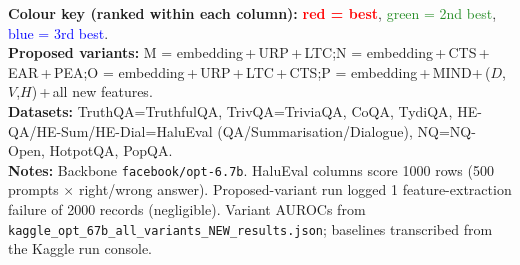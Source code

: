 \documentclass[10pt]{article}
\begin{document}
\vspace{10pt}
{\footnotesize
\textbf{Colour key (ranked within each column):} \textcolor{red}{\textbf{red = best}}, \quad\textcolor{ForestGreen}{green = 2nd best}, \quad\textcolor{blue}{blue = 3rd best}.\\[3pt]
\textbf{Proposed variants:} \;M = embedding\,+\,URP\,+\,LTC;\quad N = embedding\,+\,CTS\,+\,EAR\,+\,PEA;\quad O = embedding\,+\,URP\,+\,LTC\,+\,CTS;\quad P = embedding\,+\,MIND+\,($D$,$V$,$H$)\,+\,all new features.\\[3pt]
\textbf{Datasets:} \;TruthQA=TruthfulQA, TrivQA=TriviaQA, CoQA, TydiQA, HE-QA/HE-Sum/HE-Dial=HaluEval (QA/Summarisation/Dialogue), NQ=NQ-Open, HotpotQA, PopQA.\\[3pt]
\textbf{Notes:} \;Backbone \texttt{facebook/opt-6.7b}. HaluEval columns score 1000 rows (500 prompts $\times$ right/wrong answer). Proposed-variant run logged 1 feature-extraction failure of 2000 records (negligible). Variant AUROCs from \texttt{kaggle\_opt\_67b\_all\_variants\_NEW\_results.json}; baselines transcribed from the Kaggle run console.
}
\end{document}
